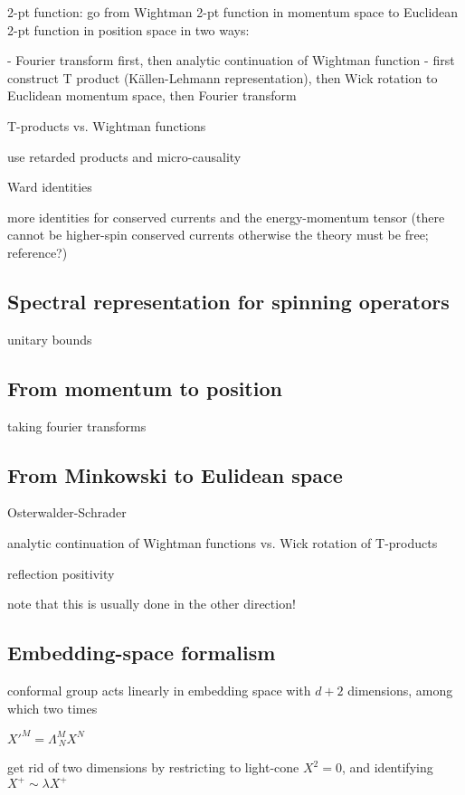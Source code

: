 \documentclass[a4paper,12pt]{article}
\numberwithin{equation}{section}
\begin{document}
2-pt function: go from Wightman 2-pt function in momentum space to Euclidean 2-pt function in position space in two ways:

- Fourier transform first, then analytic continuation of Wightman function
- first construct T product (Källen-Lehmann representation), then Wick rotation to Euclidean momentum space, then Fourier transform



T-products vs. Wightman functions

use retarded products and micro-causality


Ward identities

more identities for conserved currents and the energy-momentum tensor
(there cannot be higher-spin conserved currents otherwise the theory must be free; reference?)


\subsection{Spectral representation for spinning operators}

unitary bounds

\subsection{From momentum to position}

taking fourier transforms

\subsection{From Minkowski to Eulidean space}

Osterwalder-Schrader

analytic continuation of Wightman functions vs. Wick rotation of T-products

reflection positivity

note that this is usually done in the other direction!

\subsection{Embedding-space formalism}

conformal group acts linearly in embedding space with $d+2$ dimensions, among which two times

$X'^M = \Lambda^M_{~N} X^N$

get rid of two dimensions by restricting to light-cone $X^2 = 0$, and identifying $X^+ \sim \lambda X^+$
\end{document}

